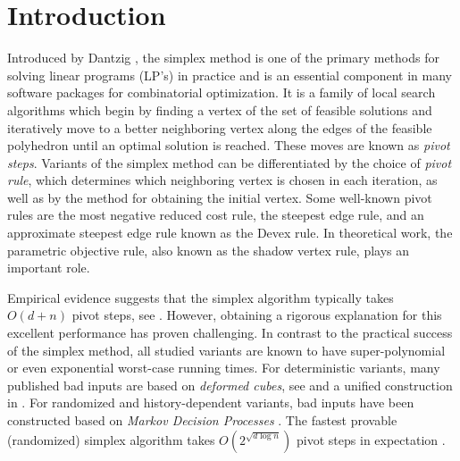 \documentclass{article}\usepackage[a4paper,margin=20mm]{geometry}
\begin{document}




\section{Introduction}

Introduced by Dantzig \cite{dan51},
the simplex method is one of the primary methods
for solving linear programs (LP's) in practice and is an essential component in many software packages
for combinatorial optimization.
It is a family of local search algorithms which begin by finding a vertex of the set of feasible solutions
and iteratively move to a better neighboring vertex along
the edges of the feasible polyhedron until an optimal solution is reached. These moves are known as \emph{pivot steps}.
Variants of the simplex method can be differentiated by the choice of \emph{pivot rule},
which determines which neighboring vertex is chosen in each iteration,
as well as by the method for obtaining the initial vertex.
Some well-known pivot rules are the most negative reduced cost rule,
the steepest edge rule, and an approximate steepest edge rule known as the
Devex rule.  In theoretical work, the parametric objective rule, also known as
the shadow vertex rule, plays an important role.

Empirical evidence suggests that the simplex algorithm typically takes $O(d + n)$ pivot steps, see
\cite{sha87, andrei2004complexity, Goldfarb1994}.
However, obtaining a rigorous explanation for this excellent
performance has proven challenging.
In contrast to the practical success of the simplex method, all studied variants
are known to have super-polynomial or even exponential worst-case running times.
For deterministic variants, many published bad inputs are based on \emph{deformed cubes},
see \cite{km72, jer73, AC78, GS79, Mur80, gol76} and a unified construction
in \cite{jour/cm/AZ98}.
For randomized and history-dependent variants, bad inputs have been constructed
based on \emph{Markov Decision Processes}
\cite{k92, msw96, conf/stoc/FHZ11, conf/ipco/Friedmann11, hz15, disser2020exponential}.
The fastest provable (randomized) simplex algorithm takes
$O(2^{\sqrt{d\log n}})$ pivot steps in expectation \cite{k92, msw96, hz15}.
\end{document}
